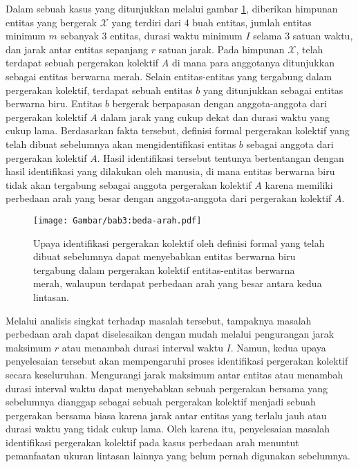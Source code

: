 Dalam sebuah kasus yang ditunjukkan melalui gambar \ref{bab3:masalah-arah}, diberikan himpunan entitas yang bergerak $\mathcal{X}$ yang terdiri dari 4 buah entitas, jumlah entitas minimum $m$ sebanyak $3$ entitas, durasi waktu minimum $I$ selama $3$ satuan waktu, dan jarak antar entitas sepanjang $r$ satuan jarak. Pada himpunan $\mathcal{X}$, telah terdapat sebuah pergerakan kolektif $A$ di mana para anggotanya ditunjukkan sebagai entitas berwarna merah. Selain entitas-entitas yang tergabung dalam pergerakan kolektif, terdapat sebuah entitas $b$ yang ditunjukkan sebagai entitas berwarna biru. Entitas $b$ bergerak berpapasan dengan anggota-anggota dari pergerakan kolektif $A$ dalam jarak yang cukup dekat dan durasi waktu yang cukup lama. Berdasarkan fakta tersebut, definisi formal pergerakan kolektif yang telah dibuat sebelumnya akan mengidentifikasi entitas $b$ sebagai anggota dari pergerakan kolektif $A$. Hasil identifikasi tersebut tentunya bertentangan dengan hasil identifikasi yang dilakukan oleh manusia, di mana entitas berwarna biru tidak akan tergabung sebagai anggota pergerakan kolektif $A$ karena memiliki perbedaan arah yang besar dengan anggota-anggota dari pergerakan kolektif $A$.

\begin{figure}[t]
    \centering
    \texttt{[image: Gambar/bab3:beda-arah.pdf]}
    \caption[Kasus perbedaan arah]{Upaya identifikasi pergerakan kolektif oleh definisi formal yang telah dibuat sebelumnya dapat menyebabkan entitas berwarna biru tergabung dalam pergerakan kolektif entitas-entitas berwarna merah, walaupun terdapat perbedaan arah yang besar antara kedua lintasan.}
    \label{bab3:masalah-arah}
\end{figure}
    
Melalui analisis singkat terhadap masalah tersebut, tampaknya masalah perbedaan arah dapat diselesaikan dengan mudah melalui pengurangan jarak maksimum $r$ atau menambah durasi interval waktu $I$. Namun, kedua upaya penyelesaian tersebut akan mempengaruhi proses identifikasi pergerakan kolektif secara keseluruhan. Mengurangi jarak maksimum antar entitas atau menambah durasi interval waktu dapat menyebabkan sebuah pergerakan bersama yang sebelumnya dianggap sebagai sebuah pergerakan kolektif menjadi sebuah pergerakan bersama biasa karena jarak antar entitas yang terlalu jauh atau durasi waktu yang tidak cukup lama. Oleh karena itu, penyelesaian masalah identifikasi pergerakan kolektif pada kasus perbedaan arah menuntut pemanfaatan ukuran lintasan lainnya yang belum pernah digunakan sebelumnya.
    
